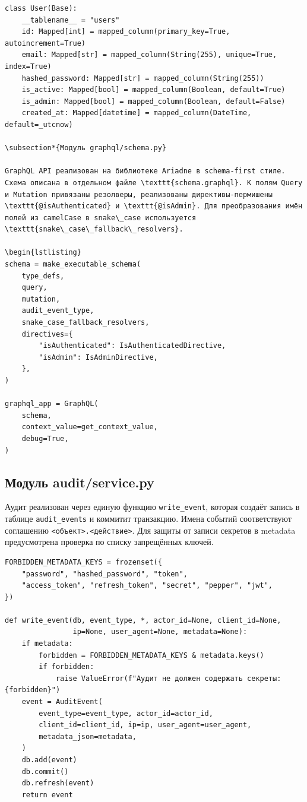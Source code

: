 \documentclass[oneside,a4paper,14pt]{extarticle}
\begin{document}
\begin{lstlisting}
class User(Base):
    __tablename__ = "users"
    id: Mapped[int] = mapped_column(primary_key=True, autoincrement=True)
    email: Mapped[str] = mapped_column(String(255), unique=True, index=True)
    hashed_password: Mapped[str] = mapped_column(String(255))
    is_active: Mapped[bool] = mapped_column(Boolean, default=True)
    is_admin: Mapped[bool] = mapped_column(Boolean, default=False)
    created_at: Mapped[datetime] = mapped_column(DateTime, default=_utcnow)

\subsection*{Модуль graphql/schema.py}

GraphQL API реализован на библиотеке Ariadne в schema-first стиле. Схема описана в отдельном файле \texttt{schema.graphql}. К полям Query и Mutation привязаны резолверы, реализованы директивы-пермишены \texttt{@isAuthenticated} и \texttt{@isAdmin}. Для преобразования имён полей из camelCase в snake\_case используется \texttt{snake\_case\_fallback\_resolvers}.

\begin{lstlisting}
schema = make_executable_schema(
    type_defs,
    query,
    mutation,
    audit_event_type,
    snake_case_fallback_resolvers,
    directives={
        "isAuthenticated": IsAuthenticatedDirective,
        "isAdmin": IsAdminDirective,
    },
)

graphql_app = GraphQL(
    schema,
    context_value=get_context_value,
    debug=True,
)
\end{lstlisting}

\subsection*{Модуль audit/service.py}

Аудит реализован через единую функцию \texttt{write\_event}, которая создаёт запись в таблице \texttt{audit\_events} и коммитит транзакцию. Имена событий соответствуют соглашению \texttt{<объект>.<действие>}. Для защиты от записи секретов в metadata предусмотрена проверка по списку запрещённых ключей.

\begin{lstlisting}
FORBIDDEN_METADATA_KEYS = frozenset({
    "password", "hashed_password", "token",
    "access_token", "refresh_token", "secret", "pepper", "jwt",
})

def write_event(db, event_type, *, actor_id=None, client_id=None,
                ip=None, user_agent=None, metadata=None):
    if metadata:
        forbidden = FORBIDDEN_METADATA_KEYS & metadata.keys()
        if forbidden:
            raise ValueError(f"Аудит не должен содержать секреты: {forbidden}")
    event = AuditEvent(
        event_type=event_type, actor_id=actor_id,
        client_id=client_id, ip=ip, user_agent=user_agent,
        metadata_json=metadata,
    )
    db.add(event)
    db.commit()
    db.refresh(event)
    return event
\end{lstlisting}
\end{document}
